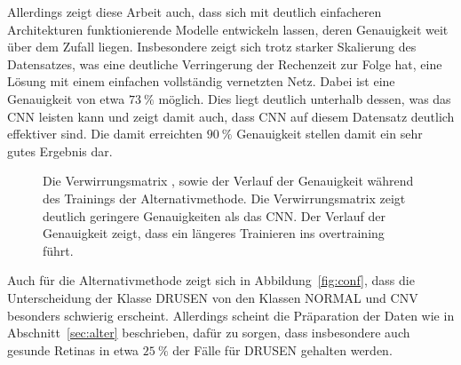 %
Allerdings zeigt diese Arbeit auch, dass sich mit deutlich einfacheren
Architekturen funktionierende Modelle entwickeln lassen, deren Genauigkeit weit
über dem Zufall liegen. Insbesondere zeigt sich trotz starker Skalierung des
Datensatzes, was eine deutliche Verringerung der Rechenzeit
zur Folge hat, eine Lösung mit einem einfachen vollständig vernetzten Netz.
Dabei ist eine Genauigkeit von etwa $\SI{73}{\percent}$ möglich. Dies liegt
deutlich unterhalb dessen, was das CNN leisten kann und zeigt damit auch, dass
CNN auf diesem Datensatz deutlich effektiver sind. Die damit erreichten
$\SI{90}{\percent}$ Genauigkeit stellen damit ein sehr gutes Ergebnis dar.
%
\begin{figure}[h!]
  \caption{Die Verwirrungsmatrix \protect{}, sowie der Verlauf der Genauigkeit \protect{} während des Trainings der Alternativmethode. Die Verwirrungsmatrix zeigt deutlich geringere Genauigkeiten als das CNN. Der Verlauf der Genauigkeit zeigt, dass ein längeres Trainieren ins overtraining führt.}
  \label{fig:erg}
\end{figure}
%
Auch für die Alternativmethode zeigt sich in Abbildung~\ref{fig:conf}, dass die
Unterscheidung der Klasse DRUSEN von den Klassen NORMAL und CNV besonders
schwierig erscheint. Allerdings scheint die Präparation der Daten wie in
Abschnitt~\ref{sec:alter} beschrieben, dafür zu sorgen, dass insbesondere auch
gesunde Retinas in etwa $\SI{25}{\percent}$ der Fälle für DRUSEN gehalten
werden.
